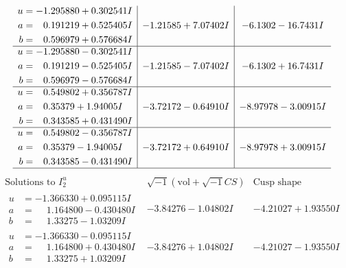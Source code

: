 \documentclass[1p]{elsarticle_modified}
\theoremstyle{definition}
\newcommand{\I}{\sqrt{-1}}
\begin{document}
$$\begin{array}{c|c|c}
\begin{aligned}
u &= -1.295880 + 0.302541 I \\
a &= \phantom{-}0.191219 + 0.525405 I \\
b &= \phantom{-}0.596979 + 0.576684 I\end{aligned}
 & -1.21585 + 7.07402 I & -6.1302 - 16.7431 I \\ \hline\begin{aligned}
u &= -1.295880 - 0.302541 I \\
a &= \phantom{-}0.191219 - 0.525405 I \\
b &= \phantom{-}0.596979 - 0.576684 I\end{aligned}
 & -1.21585 - 7.07402 I & -6.1302 + 16.7431 I \\ \hline\begin{aligned}
u &= \phantom{-}0.549802 + 0.356787 I \\
a &= \phantom{-}0.35379 + 1.94005 I \\
b &= \phantom{-}0.343585 + 0.431490 I\end{aligned}
 & -3.72172 - 0.64910 I & -8.97978 - 3.00915 I \\ \hline\begin{aligned}
u &= \phantom{-}0.549802 - 0.356787 I \\
a &= \phantom{-}0.35379 - 1.94005 I \\
b &= \phantom{-}0.343585 - 0.431490 I\end{aligned}
 & -3.72172 + 0.64910 I & -8.97978 + 3.00915 I\\
 \hline 
 \end{array}$$\newpage$$\begin{array}{c|c|c}  
\text{Solutions to }I^u_{2}& \I (\text{vol} + \sqrt{-1}CS) & \text{Cusp shape}\\
 \hline 
\begin{aligned}
u &= -1.366330 + 0.095115 I \\
a &= \phantom{-}1.164800 - 0.430480 I \\
b &= \phantom{-}1.33275 - 1.03209 I\end{aligned}
 & -3.84276 - 1.04802 I & -4.21027 + 1.93550 I \\ \hline\begin{aligned}
u &= -1.366330 - 0.095115 I \\
a &= \phantom{-}1.164800 + 0.430480 I \\
b &= \phantom{-}1.33275 + 1.03209 I\end{aligned}
 & -3.84276 + 1.04802 I & -4.21027 - 1.93550 I \\ \hline\begin{aligned}

\end{aligned}
\end{array}$$
\end{document}
